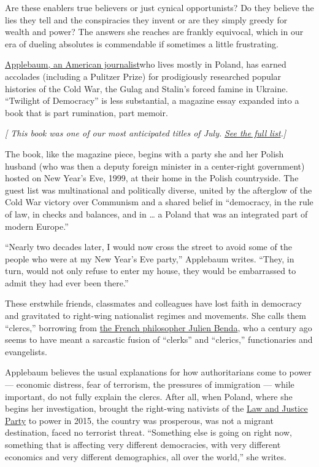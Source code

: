 Are these enablers true believers or just cynical opportunists? Do they
believe the lies they tell and the conspiracies they invent or are they
simply greedy for wealth and power? The answers she reaches are frankly
equivocal, which in our era of dueling absolutes is commendable if
sometimes a little frustrating.

\href{https://www.anneapplebaum.com}{Applebaum, an American
journalist}who lives mostly in Poland, has earned accolades (including a
Pulitzer Prize) for prodigiously researched popular histories of the
Cold War, the Gulag and Stalin's forced famine in Ukraine. ``Twilight of
Democracy'' is less substantial, a magazine essay expanded into a book
that is part rumination, part memoir.

\emph{{[} This book was one of our most anticipated titles of July.}
\href{https://www.nytimes.com/2020/06/24/books/new-july-books.html}{\emph{See
the full list}}\emph{.{]}}

The book, like the magazine piece, begins with a party she and her
Polish husband (who was then a deputy foreign minister in a center-right
government) hosted on New Year's Eve, 1999, at their home in the Polish
countryside. The guest list was multinational and politically diverse,
united by the afterglow of the Cold War victory over Communism and a
shared belief in ``democracy, in the rule of law, in checks and
balances, and in \ldots{} a Poland that was an integrated part of modern
Europe.''

``Nearly two decades later, I would now cross the street to avoid some
of the people who were at my New Year's Eve party,'' Applebaum writes.
``They, in turn, would not only refuse to enter my house, they would be
embarrassed to admit they had ever been there.''

These erstwhile friends, classmates and colleagues have lost faith in
democracy and gravitated to right-wing nationalist regimes and
movements. She calls them ``clercs,'' borrowing from
\href{https://www.britannica.com/biography/Julien-Benda}{the French
philosopher Julien Benda}, who a century ago seems to have meant a
sarcastic fusion of ``clerks'' and ``clerics,'' functionaries and
evangelists.

Applebaum believes the usual explanations for how authoritarians come to
power --- economic distress, fear of terrorism, the pressures of
immigration --- while important, do not fully explain the clercs. After
all, when Poland, where she begins her investigation, brought the
right-wing nativists of the
\href{https://foreignpolicy.com/2019/10/11/pis-centuries-old-divides-polands-east-west-elections/}{Law
and Justice Party} to power in 2015, the country was prosperous, was not
a migrant destination, faced no terrorist threat. ``Something else is
going on right now, something that is affecting very different
democracies, with very different economics and very different
demographics, all over the world,'' she writes.

